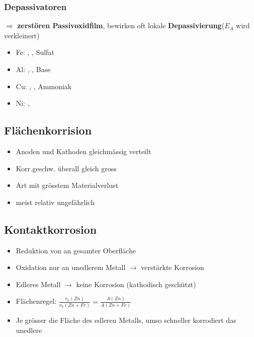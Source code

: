     \subsubsection{Depassivatoren}
        $\Rightarrow$ \textbf{zerstören Passivoxidfilm}, bewirken oft lokale \textbf{Depassivierung}($E_A$ wird verkleinert)
        \begin{itemize}
            \item Fe: \color{blue} \color{black}, \color{red} \color{black}, Sulfat 
            \item Al: \color{blue} \color{black}, \color{red} \color{black}, Base 
            \item Cu: \color{blue} \color{black}, \color{red} \color{black}, Ammoniak 
            \item Ni: \color{blue} \color{black}, \color{red} \color{black}
        \end{itemize}
    

\subsection{Flächenkorrision}
    \begin{itemize}
        \item Anoden und Kathoden gleichmässig verteilt
        \item Korr.geschw. überall gleich gross
        \item Art mit grösstem Materialverlust
        \item meist relativ ungefährlich
    \end{itemize}

\subsection{Kontaktkorrosion}
    \begin{itemize}
        \item Reduktion von  an gesamter Oberfläche
        \item Oxidation nur an unedlerem Metall $\rightarrow$ verstärkte Korrosion
        \item Edleres Metall $\rightarrow$ keine Korrosion (kathodisch geschützt)
        \item Flächenregel: $\frac{v_k(Zn)}{v_k(Zn + Fe)} = \frac{A(Zn)}{A(Zn + Fe)}$
        \item[] Je grösser die Fläche des edleren Metalls, umso schneller korrodiert das unedlere
    \end{itemize}

